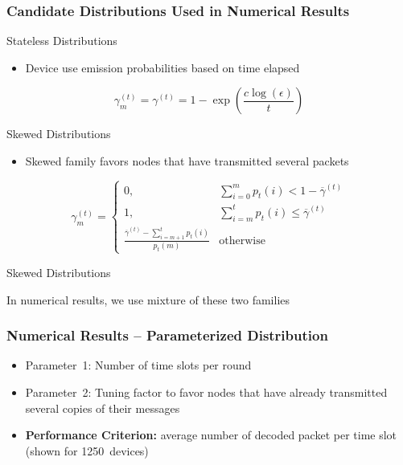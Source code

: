 \documentclass[10pt]{beamer}
\begin{document}
\begin{frame}
\frametitle{Candidate Distributions Used in Numerical Results}
\begin{block}{Stateless Distributions}
\begin{itemize}
\item Device use emission probabilities based on time elapsed
\end{itemize}
\begin{equation*}
\gamma^{(t)}_m = \gamma^{(t)}
= 1 - \exp \left( \frac{c \log(\epsilon)}{t} \right)
\end{equation*}
\end{block}
\begin{block}{Skewed Distributions}
\begin{itemize}
\item Skewed family favors nodes that have transmitted several packets
\end{itemize}
\begin{equation*}
\gamma_m^{(t)} = \begin{cases}
0, & \sum_{i=0}^m p_t(i) < 1 - \overline{\gamma}^{(t)} \\
1, & \sum_{i=m}^{t} p_t(i) \leq \overline{\gamma}^{(t)} \\
\frac{\overline{\gamma}^{(t)} - \sum_{i=m+1}^{t} p_t(i)}{p_t(m)}
& \text{otherwise}
\end{cases}
\end{equation*}
\end{block}
\begin{block}{Skewed Distributions}
\begin{center}
In numerical results, we use mixture of these two families
\end{center}
\end{block}
\end{frame}



\begin{frame}
\frametitle{Numerical Results -- Parameterized Distribution}
\begin{itemize}
\item Parameter~1: Number of time slots per round
\item Parameter~2: Tuning factor to favor nodes that have already transmitted several copies of their messages
\item \textbf{Performance Criterion:} average number of decoded packet per time slot (shown for 1250~devices)
\end{itemize}
\begin{center}

\end{center}
\end{frame}
\end{document}
